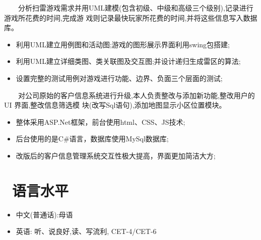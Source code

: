 \documentclass{resume}
\begin{document}
{\ \ \ \ 分析扫雷游戏需求并用UML建模(包含初级、中级和高级三个级别),记录进行游戏所花费的时间,完成游
戏则记录最快玩家所花费的时间,并将这些信息写入数据库。}
\begin{itemize}
  \item 利用UML建立用例图和活动图;游戏的图形展示界面利用swing包搭建;
  \item 利用UML建立详细类图、类关联图及交互图;并设计递归生成雷区的算法;
  \item 设置完整的测试用例对游戏进行功能、边界、负面三个层面的测试;
\end{itemize}
\medskip


{\ \ \ \ 对公司原始的客户信息系统进行升级,本人负责整改与添加新功能,整改用户的UI 界面,整改信息筛选模
块(改写Sql语句),添加地图显示小区位置模块。}
\begin{itemize}
  \item 整体采用ASP.Net框架，前台使用html、CSS、JS技术;
  \item 后台使用的是C\#语言，数据库使用MySql数据库;
  \item 改版后的客户信息管理系统交互性极大提高，界面更加简洁大方;
\end{itemize}
\medskip


\section{\faLanguage\ 语言水平}
\begin{itemize}[parsep=0.5ex]
  \item 中文(普通话):母语
  \item 英语: 听、说良好,读、写流利, CET-4/CET-6
\end{itemize}
\medskip
\end{document}
